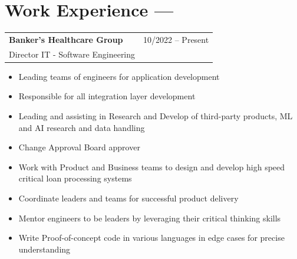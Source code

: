 \documentclass[10pt]{report}
\begin{document}

\pagebreak

\section*{Work Experience ---}

\noindent
\begin{tabular}{ L{.5\textwidth}  R{.4\textwidth} }
\textbf{\large Banker's Healthcare Group} & 10/2022 -- Present \\
{Director IT - Software Engineering} &
\end{tabular}


\begin{itemize}
\item Leading teams of engineers for application development
\item Responsible for all integration layer development
\item Leading and assisting in Research and Develop of third-party products, ML and AI research and data handling
\item Change Approval Board approver
\item Work with Product and Business teams to design and develop high speed critical loan processing systems
\item Coordinate leaders and teams for successful product delivery
\item Mentor engineers to be leaders by leveraging their critical thinking skills
\item Write Proof-of-concept code in various languages in edge cases for precise understanding 
\end{itemize}
\bigskip
\end{document}
